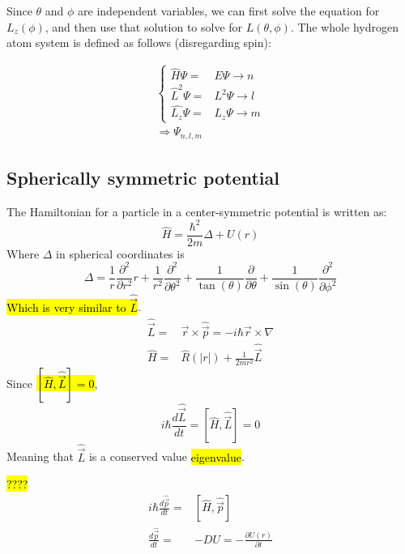 	Since $\theta$ and $\phi$ are independent variables, we can first solve the equation for $L_z(\phi)$, and then use that solution to solve for $L(\theta, \phi)$. The whole hydrogen atom system is defined as follows (disregarding spin):
	
	\begin{align}
		\left\{ \begin{aligned}
			\hat{H} \Psi =& E \Psi \rightarrow n\\
			\hat{L}^2 \Psi =& L^2 \Psi \rightarrow l \\
			\hat{L_z} \Psi =& L_z \Psi  \rightarrow m
		\end{aligned} \right. \\
		\Rightarrow \Psi_{n,l,m}
	\end{align}
	\subsection{Spherically symmetric potential}
		The Hamiltonian for a particle in a center-symmetric potential is written as:
		\begin{equation}
			\hat{H} = \frac{\hbar^2}{2m}\Delta + U(r)
		\end{equation}
		Where $\Delta$ in spherical coordinates is
		\begin{equation}
			\Delta = \frac{1}{r}\frac{\partial^2}{\partial r ^2}r + \frac{1}{r^2} \frac{\partial^2}{\partial \theta^2} + \frac{1}{\tan(\theta)}\frac{\partial}{\partial \theta} + \frac{1}{\sin(\theta)}\frac{\partial^2}{\partial \phi^2}
		\end{equation}
		\hl{Which is very similar to $\hat{\vec{L}}$}.
		\begin{align}
			\hat{\vec{L}} =& \vec{r}\times\hat{\vec{p}} = -i\hbar\vec{r}\times\nabla \\
			\hat{H} =& \hat{R}(|r|) + \frac{1}{2m r^2}\hat{\vec{L}}
		\end{align}
		Since \hl{$\left[\hat{H}, \hat{\vec{L}}\right] = 0$},
		\begin{equation}
			i\hbar\frac{d\hat{\vec{L}}}{dt} = \left[\hat{H}, \hat{\vec{L}}\right] = 0
		\end{equation}
		Meaning that $\hat{\vec{L}}$ is a conserved value \hl{eigenvalue}.
		
		\hl{????}
		\begin{align}
			i\hbar\frac{d\hat{\vec{p}}}{dt} =& \left[\hat{H}, \hat{\vec{p}}\right] \\
			\frac{d\hat{\vec{p}}}{dt} =& -DU = -\frac{\partial U(r)}{\partial t}
		\end{align}
		
